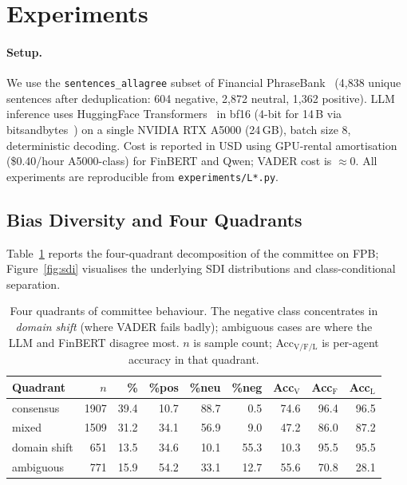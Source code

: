 \section{Experiments}
\label{sec:experiments}

\paragraph{Setup.}
We use the \texttt{sentences\_allagree} subset of Financial
PhraseBank~\cite{malo2014fpb,flarefpb} (4{,}838 unique sentences after
deduplication: 604 negative, 2{,}872 neutral, 1{,}362 positive).
LLM inference uses HuggingFace Transformers~\cite{wolf2020transformers}
in bf16 (4-bit for 14\,B via bitsandbytes~\cite{dettmers2023bnb}) on
a single NVIDIA RTX A5000 (24\,GB), batch size 8, deterministic
decoding. Cost is reported in USD using GPU-rental amortisation
(\$0.40/hour A5000-class) for FinBERT and Qwen; VADER cost is
$\approx\!0$. All experiments are reproducible from
\texttt{experiments/L*.py}.

\subsection{Bias Diversity and Four Quadrants}
\label{sec:experiments:bias}

Table~\ref{tab:quadrant} reports the four-quadrant decomposition of
the committee on FPB; Figure~\ref{fig:sdi} visualises the underlying
SDI distributions and class-conditional separation.

\begin{table}[t]
\centering
\small
\caption{Four quadrants of committee behaviour. The negative class
concentrates in \textit{domain shift} (where VADER fails badly);
ambiguous cases are where the LLM and FinBERT disagree most. $n$
is sample count; Acc$_\mathrm{V/F/L}$ is per-agent accuracy in that
quadrant.}
\label{tab:quadrant}
\begin{tabular}{lrrrrrrrr}
\toprule
Quadrant & $n$ & \% & \%pos & \%neu & \%neg
         & Acc$_\mathrm{V}$ & Acc$_\mathrm{F}$ & Acc$_\mathrm{L}$ \\
\midrule
consensus     & 1907 & 39.4 & 10.7 & 88.7 &  0.5 & 74.6 & 96.4 & 96.5 \\
mixed         & 1509 & 31.2 & 34.1 & 56.9 &  9.0 & 47.2 & 86.0 & 87.2 \\
domain shift  &  651 & 13.5 & 34.6 & 10.1 & 55.3 & 10.3 & 95.5 & 95.5 \\
ambiguous     &  771 & 15.9 & 54.2 & 33.1 & 12.7 & 55.6 & 70.8 & 28.1 \\
\bottomrule
\end{tabular}
\end{table}

